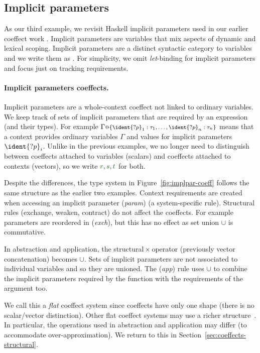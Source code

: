 
\subsection{Implicit parameters}
\label{sec:intro-coeffects-impl}

As our third example, we revisit Haskell implicit parameters \cite{lewis2000implicit} 
used in our earlier coeffect work \cite{petricek2013coeffects}. Implicit parameters are variables
that mix aspects of dynamic and lexical scoping. Implicit parameters are a distinct syntactic 
category to variables and we write them as . For simplicity, we omit \emph{let}-binding for
implicit parameters and focus just on tracking requirements.

\paragraph{Implicit parameters coeffects.} Implicit parameters are a whole-context coeffect 
not linked to ordinary variables. We keep track of sets of implicit parameters that are required
by an expression (and their types). For example $\coctx{\Gamma}{\{ \ident{?p}_1 : \tau_1, \ldots, \ident{?p}_n : \tau_n \}}$
means that a context provides ordinary variables $\Gamma$ and values for implicit parameters $\ident{?p}_i$.
Unlike in the previous examples, we no longer need to distinguish between coeffects attached
to variables (scalars) and coeffects attached to contexts (vectors), so we write $\cclrd{r},\cclrd{s},\cclrd{t}$
for both.

Despite the differences, the type system in Figure~\ref{fig:implpar-coeff} follows the same 
structure as the earlier two examples. Context requirements are created when accessing an implicit
parameter (\emph{param}) (a system-specific rule). Structural rules (exchange, weaken, contract) 
do not affect the coeffects. For example parameters are reordered in (\emph{exch}),
but this has no effect as set union $\cup$ is commutative.

In abstraction and application, the structural $\hspace{-0.15em}\times\hspace{-0.25em}$ operator (previously vector 
concatenation) becomes $\cup$. Sets of implicit parameters are not associated to
individual variables and so they are unioned. The (\emph{app}) rule uses $\cup$ to
combine the implicit parameters required by the function with the requirements of the argument too.

We call this a \emph{flat} coeffect system since coeffects have only
one shape (there is no scalar/vector distinction).  Other flat
coeffect systems may use a richer structure~\cite{petricek2013coeffects}. In
particular, the operations used in abstraction and application may differ
(to accommodate over-approximation). We return to this in
Section~\ref{sec:coeffects-structural}.

